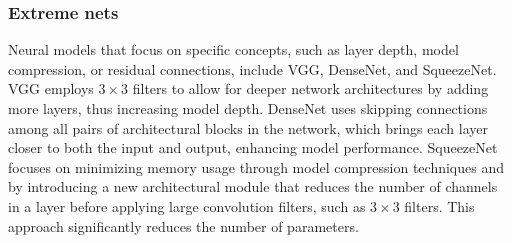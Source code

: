 





\FloatBarrier

\subsubsection{Extreme nets}

Neural models that focus on specific concepts, such as layer depth, model compression, or residual connections, include VGG, DenseNet, and SqueezeNet. VGG employs $3\times 3$ filters to allow for deeper network architectures by adding more layers, thus increasing model depth. DenseNet uses skipping connections among all pairs of architectural blocks in the network, which brings each layer closer to both the input and output, enhancing model performance. SqueezeNet focuses on minimizing memory usage through model compression techniques and by introducing a new architectural module that reduces the number of channels in a layer before applying large convolution filters, such as $3 \times 3$ filters. This approach significantly reduces the number of parameters.


